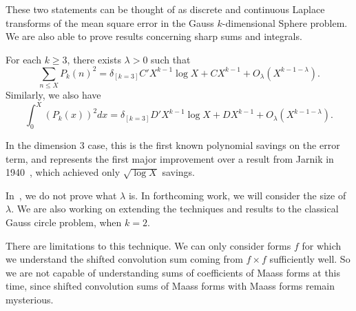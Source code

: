 These two statements can be thought of as discrete and continuous Laplace transforms of
the mean square error in the Gauss $k$-dimensional Sphere problem.
We are also able to prove results concerning sharp sums and integrals.

\begin{theorem}

  For each $k \geq 3$, there exists $\lambda > 0$ such that
  \begin{equation}
    \sum_{n \leq X} P_k(n)^2 = \delta_{[k = 3]} C' X^{k-1} \log X + C X^{k-1} +
    O_{\lambda}(X^{k - 1 - \lambda}).
  \end{equation}
  Similarly, we also have
  \begin{equation}
    \int_0^X (P_k(x))^2 dx = \delta_{[k = 3]} D' X^{k-1} \log X + D X^{k-1} +
    O_{\lambda}(X^{k-1 - \lambda}).
  \end{equation}

\end{theorem}


In the dimension $3$ case, this is the first known polynomial savings on the error term,
and represents the first major improvement over a result from Jarnik in
1940~\cite{Jarnik40}, which achieved only $\sqrt{\log X}$ savings.


In~\cite{HulseGaussSphere}, we do not prove what $\lambda$ is.
In forthcoming work, we will consider the size of $\lambda$.
We are also working on extending the techniques and results to the classical Gauss circle
problem, when $k = 2$.



\begin{remark}
  There are limitations to this technique.
  We can only consider forms $f$ for which we understand the shifted convolution sum
  coming from $f \times f$ sufficiently well.
  So we are not capable of understanding sums of coefficients of Maass forms at this time,
  since shifted convolution sums of Maass forms with Maass forms remain mysterious.
\end{remark}


